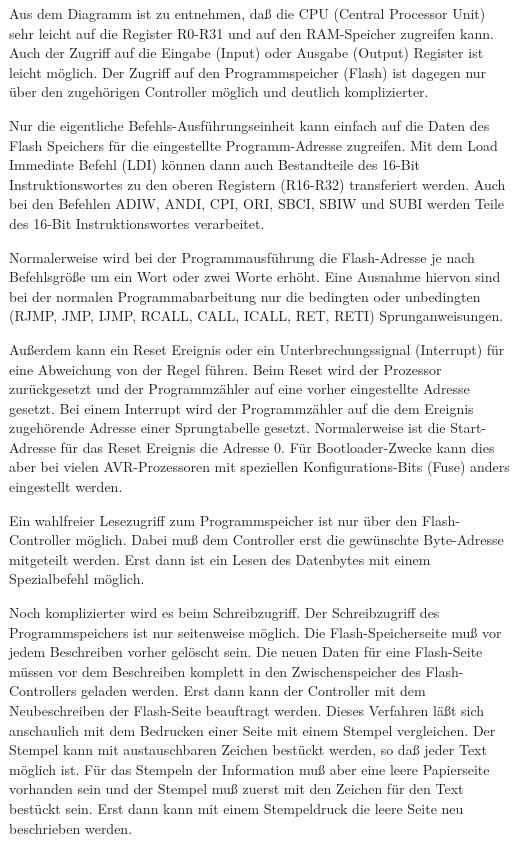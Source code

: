 Aus dem Diagramm ist zu entnehmen, daß die
CPU (Central Processor Unit) sehr leicht auf die Register R0-R31 und
auf den RAM-Speicher zugreifen kann. Auch der Zugriff auf die
Eingabe (Input) oder Ausgabe (Output) Register ist leicht möglich.
Der Zugriff auf den Programmspeicher (Flash) ist dagegen nur über
den zugehörigen Controller möglich und deutlich komplizierter.

Nur die eigentliche Befehls-Ausführungseinheit kann einfach auf
die Daten des Flash Speichers für die eingestellte Programm-Adresse zugreifen.
Mit dem Load Immediate Befehl (LDI) können dann auch Bestandteile des 
16-Bit Instruktionswortes zu den oberen Registern (R16-R32) transferiert werden. 
Auch bei den Befehlen ADIW, ANDI, CPI, ORI, SBCI, SBIW und SUBI werden Teile
des 16-Bit Instruktionswortes verarbeitet.

Normalerweise wird bei der Programmausführung die Flash-Adresse
je nach Befehlsgröße um ein Wort oder zwei Worte erhöht.
Eine Ausnahme hiervon sind bei der normalen Programmabarbeitung nur
die bedingten oder unbedingten (RJMP, JMP, IJMP, RCALL, CALL, ICALL, RET, RETI) Sprunganweisungen.

Außerdem kann ein Reset Ereignis oder ein Unterbrechungssignal (Interrupt)
für eine Abweichung von der Regel führen.
Beim Reset wird der Prozessor zurückgesetzt und der Programmzähler auf eine
vorher eingestellte Adresse gesetzt.
Bei einem Interrupt wird der Programmzähler auf die dem
Ereignis zugehörende Adresse einer Sprungtabelle gesetzt.
Normalerweise ist die Start-Adresse für das Reset Ereignis die Adresse 0.
Für Bootloader-Zwecke kann dies aber bei vielen AVR-Prozessoren mit speziellen
Konfigurations-Bits (Fuse) anders eingestellt werden.

Ein wahlfreier Lesezugriff zum Programmspeicher ist nur über den Flash-Controller
möglich. Dabei muß dem Controller erst die gewünschte Byte-Adresse mitgeteilt werden.
Erst dann ist ein Lesen des Datenbytes mit einem Spezialbefehl möglich.


Noch komplizierter wird es beim Schreibzugriff. Der Schreibzugriff des Programmspeichers
ist nur seitenweise möglich. Die Flash-Speicherseite muß vor jedem Beschreiben
vorher gelöscht sein. Die neuen Daten für eine Flash-Seite müssen vor dem
Beschreiben komplett in den Zwischenspeicher des Flash-Controllers geladen werden.
Erst dann kann der Controller mit dem Neubeschreiben der Flash-Seite beauftragt werden.
Dieses Verfahren läßt sich anschaulich mit dem Bedrucken einer Seite mit einem
Stempel vergleichen. Der Stempel kann mit austauschbaren Zeichen bestückt werden,
so daß jeder Text möglich ist. Für das Stempeln der Information muß aber
eine leere Papierseite vorhanden sein und der Stempel muß zuerst mit den
Zeichen für den Text bestückt sein.
Erst dann kann mit einem Stempeldruck die leere Seite neu beschrieben werden.

